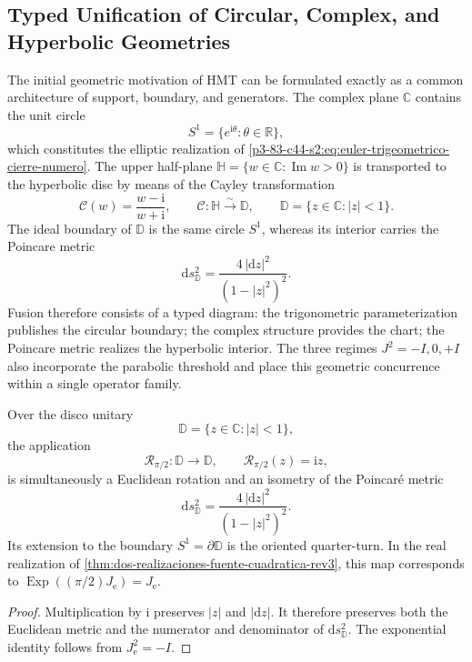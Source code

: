\subsection{Typed Unification of Circular, Complex, and Hyperbolic Geometries}
\label{p3-83-c44-s2:sec:unificacion-compleja-circular-hiperbolica-numero}

The initial geometric motivation of HMT can be formulated exactly as a
common architecture of support, boundary, and generators. The complex plane
\(\mathbb C\) contains the unit circle
\[
 S^1=\{e^{\mathrm i\theta}:\theta\in\mathbb R\},
\]
which constitutes the elliptic realization of
\eqref{p3-83-c44-s2:eq:euler-trigeometrico-cierre-numero}. The upper half-plane
\(\mathbb H=\{w\in\mathbb C:\operatorname{Im}w>0\}\) is transported to the hyperbolic
disc by means of the Cayley transformation
\[
 \mathcal C(w)=\frac{w-\mathrm i}{w+\mathrm i},
 \qquad
 \mathcal C:\mathbb H\xrightarrow{\sim}\mathbb D,
 \qquad
 \mathbb D=\{z\in\mathbb C:|z|<1\}.
\]
The ideal boundary of \(\mathbb D\) is the same circle \(S^1\), whereas its
interior carries the Poincare metric
\[
 \mathrm ds_{\mathbb D}^2
 =\frac{4\,|\mathrm dz|^2}{(1-|z|^2)^2}.
\]
Fusion therefore consists of a typed diagram: the trigonometric
parameterization publishes the circular boundary; the complex structure
provides the chart; the Poincare metric realizes the hyperbolic interior.
The three regimes \(J^2=-I,0,+I\) also incorporate the parabolic threshold and
place this geometric concurrence within a single operator family.

\begin{proposition}
\label{p3-83-c44-s2:prop:cuarto-giro-poincare-rev3}
Over the disco unitary
\[
 \mathbb D=\{z\in\mathbb C:|z|<1\},
\]
the application
\[
 \mathcal R_{\pi/2}:\mathbb D\longrightarrow\mathbb D,
 \qquad
 \mathcal R_{\pi/2}(z)=\mathrm i z,
\]
is simultaneously a Euclidean rotation and an isometry of the Poincaré
metric
\[
 \mathrm ds_{\mathbb D}^{2}
 =\frac{4\,|\mathrm dz|^2}{(1-|z|^2)^2}.
\]
Its extension to the boundary \(S^1=\partial\mathbb D\) is the oriented
quarter-turn. In the real realization of
\cref{thm:dos-realizaciones-fuente-cuadratica-rev3}, this map
corresponds to
\(\operatorname{Exp}((\pi/2)J_{\mathrm e})=J_{\mathrm e}\).
\end{proposition}

\begin{proof}
Multiplication by \(\mathrm i\) preserves \(|z|\) and
\(|\mathrm dz|\). It therefore preserves both the Euclidean metric and the
numerator and denominator of \(\mathrm ds_{\mathbb D}^{2}\). The exponential
identity follows from \(J_{\mathrm e}^2=-I\).
\end{proof}

